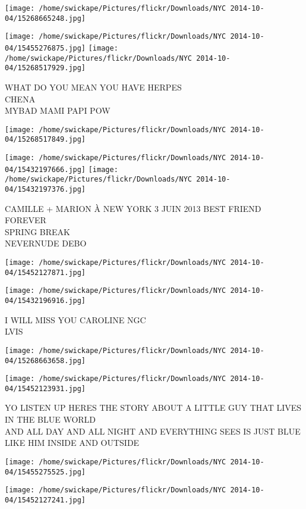 \documentclass[10pt,letterpaper]{article}
\begin{document}
\texttt{[image: /home/swickape/Pictures/flickr/Downloads/NYC 2014-10-04/15268665248.jpg]}

\vspace{0.25in}
\texttt{[image: /home/swickape/Pictures/flickr/Downloads/NYC 2014-10-04/15455276875.jpg]}
\texttt{[image: /home/swickape/Pictures/flickr/Downloads/NYC 2014-10-04/15268517929.jpg]}

WHAT DO YOU MEAN YOU HAVE HERPES\\
CHENA\\
MYBAD MAMI PAPI POW
\pagebreak

\texttt{[image: /home/swickape/Pictures/flickr/Downloads/NYC 2014-10-04/15268517849.jpg]}

\vspace{0.25in}
\texttt{[image: /home/swickape/Pictures/flickr/Downloads/NYC 2014-10-04/15432197666.jpg]}
\texttt{[image: /home/swickape/Pictures/flickr/Downloads/NYC 2014-10-04/15432197376.jpg]}

CAMILLE + MARION À NEW YORK 3 JUIN 2013 BEST FRIEND FOREVER\\
SPRING BREAK\\
NEVERNUDE DEBO
\pagebreak

\texttt{[image: /home/swickape/Pictures/flickr/Downloads/NYC 2014-10-04/15452127871.jpg]}

\vspace{0.25in}
\texttt{[image: /home/swickape/Pictures/flickr/Downloads/NYC 2014-10-04/15432196916.jpg]}

I WILL MISS YOU CAROLINE NGC\\
LVIS
\pagebreak

\texttt{[image: /home/swickape/Pictures/flickr/Downloads/NYC 2014-10-04/15268663658.jpg]}

\vspace{0.25in}
\texttt{[image: /home/swickape/Pictures/flickr/Downloads/NYC 2014-10-04/15452123931.jpg]}

YO LISTEN UP HERES THE STORY ABOUT A LITTLE GUY THAT LIVES IN THE BLUE WORLD\\
AND ALL DAY AND ALL NIGHT AND EVERYTHING SEES IS JUST BLUE LIKE HIM INSIDE AND OUTSIDE
\pagebreak

\texttt{[image: /home/swickape/Pictures/flickr/Downloads/NYC 2014-10-04/15455275525.jpg]}

\vspace{0.25in}
\texttt{[image: /home/swickape/Pictures/flickr/Downloads/NYC 2014-10-04/15452127241.jpg]}
\end{document}
